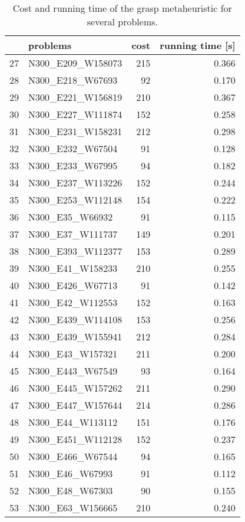 \begin{table}[H]
\centering
\begin{tabular}{llrr}
\toprule
{} &            problems &  cost &  running time [s] \\
\midrule
27 &   N300\_E209\_W158073 &   215 &             0.366 \\
28 &    N300\_E218\_W67693 &    92 &             0.170 \\
29 &   N300\_E221\_W156819 &   210 &             0.367 \\
30 &   N300\_E227\_W111874 &   152 &             0.258 \\
31 &   N300\_E231\_W158231 &   212 &             0.298 \\
32 &    N300\_E232\_W67504 &    91 &             0.128 \\
33 &    N300\_E233\_W67995 &    94 &             0.182 \\
34 &   N300\_E237\_W113226 &   152 &             0.244 \\
35 &   N300\_E253\_W112148 &   154 &             0.222 \\
36 &     N300\_E35\_W66932 &    91 &             0.115 \\
37 &    N300\_E37\_W111737 &   149 &             0.201 \\
38 &   N300\_E393\_W112377 &   153 &             0.289 \\
39 &    N300\_E41\_W158233 &   210 &             0.255 \\
40 &    N300\_E426\_W67713 &    91 &             0.142 \\
41 &    N300\_E42\_W112553 &   152 &             0.163 \\
42 &   N300\_E439\_W114108 &   153 &             0.256 \\
43 &   N300\_E439\_W155941 &   212 &             0.284 \\
44 &    N300\_E43\_W157321 &   211 &             0.200 \\
45 &    N300\_E443\_W67549 &    93 &             0.164 \\
46 &   N300\_E445\_W157262 &   211 &             0.290 \\
47 &   N300\_E447\_W157644 &   214 &             0.286 \\
48 &    N300\_E44\_W113112 &   151 &             0.176 \\
49 &   N300\_E451\_W112128 &   152 &             0.237 \\
50 &    N300\_E466\_W67544 &    94 &             0.165 \\
51 &     N300\_E46\_W67993 &    91 &             0.112 \\
52 &     N300\_E48\_W67303 &    90 &             0.155 \\
53 &    N300\_E63\_W156665 &   210 &             0.240 \\
\bottomrule
\end{tabular}
\caption{Cost and running time of the grasp metaheuristic for several problems.}
\label{table:tabu-medium-results-II}
\end{table}

